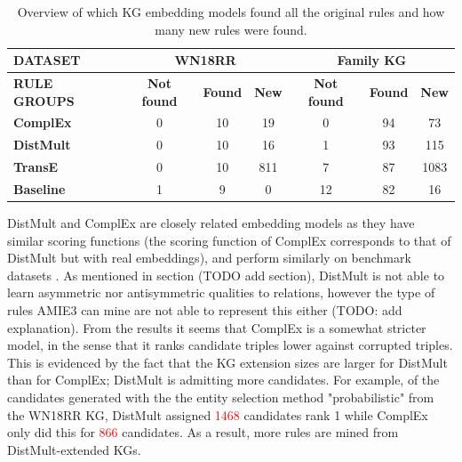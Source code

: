 \begin{table}[h]
\begin{tabular}{|l|ccc||ccc|}
\hline
{\textbf{DATASET}}   & \multicolumn{3}{c||}{\textbf{WN18RR}}                                                                              & \multicolumn{3}{c|}{\textbf{Family KG}}                                                           \\ \hline
{\textbf{RULE GROUPS}}   & \multicolumn{1}{c|}{\textbf{Not found}} & \multicolumn{1}{c|}{\textbf{Found}} & \multicolumn{1}{c||}{\textbf{New}} & \multicolumn{1}{c|}{\textbf{Not found}} & \multicolumn{1}{c|}{\textbf{Found}} & \multicolumn{1}{c|}{\textbf{New}} \\ \hline
\textbf{ComplEx}  & \multicolumn{1}{c|}{0}                  & \multicolumn{1}{c|}{10}             & \multicolumn{1}{c||}{19}           & \multicolumn{1}{c|}{0}                  & \multicolumn{1}{c|}{94}             & \multicolumn{1}{c|}{73}           \\ \hline
\textbf{DistMult} & \multicolumn{1}{c|}{0}                     & \multicolumn{1}{c|}{10}                                  & 16                                & \multicolumn{1}{c|}{1}         & \multicolumn{1}{c|}{93}          & 115                               \\ \hline
\textbf{TransE}   & \multicolumn{1}{c|}{0}         & \multicolumn{1}{c|}{10}                     & 811                               & \multicolumn{1}{c|}{7}       & \multicolumn{1}{c|}{87}      & 1083                              \\ \hline
\textbf{Baseline} & \multicolumn{1}{c|}{1}     & \multicolumn{1}{c|}{9}                   & 0                                 & \multicolumn{1}{c|}{12}       & \multicolumn{1}{c|}{82}         & 16                                \\ \hline
\end{tabular}
\caption{Overview of which KG embedding models found all the original rules and how many new rules were found.}
\end{table}

DistMult and ComplEx are closely related embedding models as they have similar scoring functions (the scoring function of ComplEx corresponds to that of DistMult but with real embeddings), and perform similarly on benchmark datasets \cite{complEx}. As mentioned in section (TODO add section), DistMult is not able to learn asymmetric nor antisymmetric qualities to relations, however the type of rules AMIE3 can mine are not able to represent this either (TODO: add explanation). From the results it seems that ComplEx is a somewhat stricter model, in the sense that it ranks candidate triples lower against corrupted triples. This is evidenced by the fact that the KG extension sizes are larger for DistMult than for ComplEx; DistMult is admitting more candidates. For example, of the candidates generated with the the entity selection method "probabilistic" from the WN18RR KG, DistMult assigned \textcolor{red}{1468} candidates rank 1 while ComplEx only did this for \textcolor{red}{866} candidates. As a result, more rules are mined from DistMult-extended KGs.

